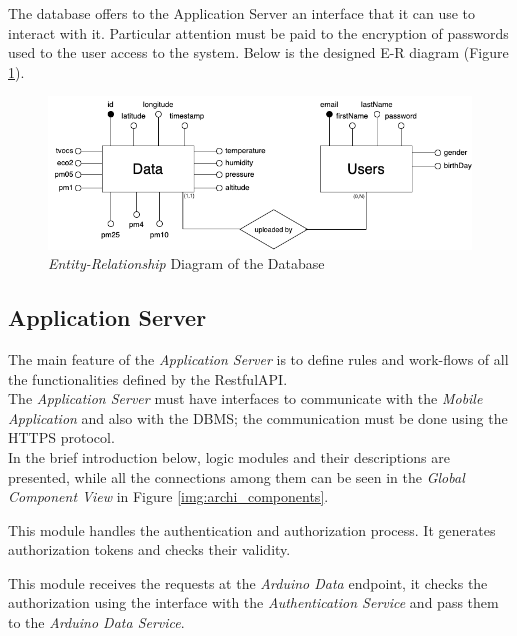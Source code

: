 The database offers to the Application Server an interface that it can use to interact with it.
Particular attention must be paid to the encryption of passwords used to the user access to the system.
Below is the designed E-R diagram (Figure \ref{img:archi_er}).

\begin{figure}[H]
\begin{center}
  \includegraphics[width=\textwidth]{img/archi/ER.png}
  \hspace{0.05\linewidth}
  \centering
  \caption{\textit{Entity-Relationship} Diagram of the Database}
  \label{img:archi_er}
\end{center}
\end{figure}

\subsection{Application Server}
The main feature of the \textit{Application Server} is to define rules and work-flows of all the functionalities defined by the RestfulAPI.\\
The \textit{Application Server} must have interfaces to communicate with the \textit{Mobile Application} and also with the DBMS; the communication must be done using the HTTPS protocol.\\
In the brief introduction below, logic modules and their descriptions are presented, while all the connections among them can be seen in the \textit{Global Component View} in Figure \ref{img:archi_components}.

This module handles the authentication and authorization process. It generates authorization tokens and checks their validity.

This module receives the requests at the \textit{Arduino Data} endpoint, it checks the authorization using the interface with the \textit{Authentication Service} and pass them to the \textit{Arduino Data Service}.

